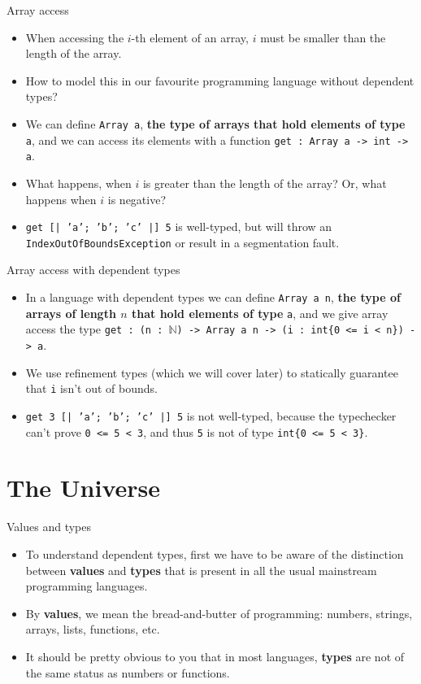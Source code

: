 \documentclass{beamer}
\newcommand{\m}[1]{\texttt{#1}}
\begin{document}
\begin{frame}{Array access}
\begin{itemize}
	\item When accessing the $i$-th element of an array, $i$ must be smaller than the length of the array.
	\item How to model this in our favourite programming language without dependent types?
	\item We can define \m{Array a}, \textbf{the type of arrays that hold elements of type} \m{a}, and we can access its elements with a function \m{get :\ Array a -> int -> a}.
	\item What happens, when $i$ is greater than the length of the array? Or, what happens when $i$ is negative?
	\item \m{get [| 'a'; 'b'; 'c' |] 5} is well-typed, but will throw an \m{IndexOutOfBoundsException} or result in a segmentation fault.
\end{itemize}
\end{frame}

\begin{frame}{Array access with dependent types}
\begin{itemize}
	\item In a language with dependent types we can define \m{Array a n}, \textbf{the type of arrays of length $n$ that hold elements of type} \m{a}, and we give array access the type \m{get :\ (n :\ $\mathbb{N}$) -> Array a n -> (i :\ int\{0 <= i < n\}) -> a}.
	\item We use refinement types (which we will cover later) to statically guarantee that \m{i} isn't out of bounds.
	\item \m{get 3 [| 'a'; 'b'; 'c' |] 5} is not well-typed, because the typechecker can't prove \m{0 <= 5 < 3}, and thus \m{5} is not of type \m{int\{0 <= 5 < 3\}}.
\end{itemize}
\end{frame}

\section{The Universe}

\begin{frame}{Values and types}
\begin{itemize}
	\item To understand dependent types, first we have to be aware of the distinction between \textbf{values} and \textbf{types} that is present in all the usual mainstream programming languages.
	\item By \textbf{values}, we mean the bread-and-butter of programming: numbers, strings, arrays, lists, functions, etc.
	\item It should be pretty obvious to you that in most languages, \textbf{types} are not of the same status as numbers or functions.
\end{itemize}
\end{frame}
\end{document}
